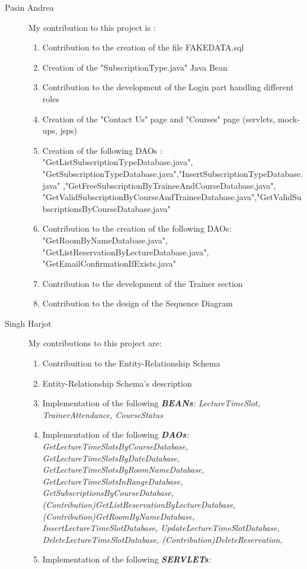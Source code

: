 \begin{description}
	\item[Pasin Andrea] My contribution to this project is :
	\begin{enumerate}
		\item Contribution to the creation of the file FAKE\textunderscore DATA.sql 
		\item Creation of the "SubscriptionType.java" Java Bean
		\item Contribution to the development of the Login part handling different roles
		\item Creation of the "Contact Us" page and "Courses" page (servlets, mock-ups, jsps)
		\item Creation of the following DAOs : "GetListSubscriptionTypeDatabase.java", "GetSubscriptionTypeDatabase.java","InsertSubscriptionTypeDatabase.java" ,"GetFreeSubscriptionByTraineeAndCourseDatabase.java", "GetValidSubscriptionByCourseAndTraineeDatabase.java","GetValidSubscriptionsByCourseDatabase.java"
		\item Contribution to the creation of the following DAOs: "GetRoomByNameDatabase.java", "GetListReservationByLectureDatabase.java", "GetEmailConfirmationIfExists.java"
		\item Contribution to the development of the Trainer section
		\item Contribution to the design of the Sequence Diagram
	\end{enumerate}
	\item[Singh Harjot] My contributions to this project are:
	\begin{flushleft}
	\begin{enumerate}
		\item Contribuition to the Entity-Relationship Schema
		\item Entity-Relationship Schema's description
		\item Implementation of the following \textit{\textbf{BEANs}:
			LectureTimeSlot, TrainerAttendance, CourseStatus
		}
		\item Implementation of the following \textit{\textbf{DAOs}:
			GetLectureTimeSlotsByCourseDatabase,
			GetLectureTimeSlotsByDateDatabase,
			GetLectureTimeSlotsByRoomNameDatabase,
			GetLectureTimeSlotsInRangeDatabase,
			GetSubscriptionsByCourseDatabase,
			(Contribution)GetListReservationByLectureDatabase,
			(Contribution)GetRoomByNameDatabase,
			InsertLectureTimeSlotDatabase,
			UpdateLectureTimeSlotDatabase,
			DeleteLectureTimeSlotDatabase,
			(Contribution)DeleteReservation,	
		}
		\item Implementation of the following \textit{\textbf{SERVLETs}: 
}
\end{enumerate}
\end{flushleft}
\end{description}
